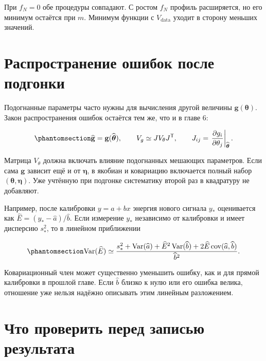 \documentclass[
  russian,
  11pt,
  a4paper,
  open=any]{scrbook}
\begin{document}
При \(f_N=0\) обе процедуры совпадают. С ростом \(f_N\) профиль
расширяется, но его минимум остаётся при \(m\). Минимум функции с
\(V_{\mathrm{data}}\) уходит в сторону меньших значений.

\section{Распространение ошибок после
подгонки}\label{ux440ux430ux441ux43fux440ux43eux441ux442ux440ux430ux43dux435ux43dux438ux435-ux43eux448ux438ux431ux43eux43a-ux43fux43eux441ux43bux435-ux43fux43eux434ux433ux43eux43dux43aux438}

Подогнанные параметры часто нужны для вычисления другой величины
\(\mathbf g(\boldsymbol\theta)\). Закон распространения ошибок остаётся
тем же, что и в главе 6:

\begin{equation}\protect\phantomsection\label{eq-ch12-post-fit-propagation}{
\widehat{\mathbf g}=\mathbf g(\widehat{\boldsymbol\theta}),
\qquad
V_g\simeq J V_\theta J^{\mathsf T},
\qquad
J_{ij}=\left.\frac{\partial g_i}{\partial\theta_j}\right|_{\widehat{\boldsymbol\theta}}.
}\end{equation}

Матрица \(V_\theta\) должна включать влияние подогнанных мешающих
параметров. Если сама \(\mathbf g\) зависит ещё и от
\(\boldsymbol\eta\), в якобиан и ковариацию включается полный набор
\((\boldsymbol\theta,\boldsymbol\eta)\). Уже учтённую при подгонке
систематику второй раз в квадратуру не добавляют.

Например, после калибровки \(y=a+bx\) энергия нового сигнала \(y_*\)
оценивается как \(\widehat E=(y_*-\widehat a)/\widehat b\). Если
измерение \(y_*\) независимо от калибровки и имеет дисперсию \(s_*^2\),
то в линейном приближении

\begin{equation}\protect\phantomsection\label{eq-ch12-inverse-calibration-error}{
\operatorname{Var}(\widehat E)\simeq
\frac{s_*^2+\operatorname{Var}(\widehat a)
+\widehat E^2\operatorname{Var}(\widehat b)
+2\widehat E\operatorname{cov}(\widehat a,\widehat b)}{\widehat b^2}.
}\end{equation}

Ковариационный член может существенно уменьшить ошибку, как и для прямой
калибровки в прошлой главе. Если \(\widehat b\) близко к нулю или его
ошибка велика, отношение уже нельзя надёжно описывать этим линейным
разложением.

\section{Что проверить перед записью
результата}\label{ux447ux442ux43e-ux43fux440ux43eux432ux435ux440ux438ux442ux44c-ux43fux435ux440ux435ux434-ux437ux430ux43fux438ux441ux44cux44e-ux440ux435ux437ux443ux43bux44cux442ux430ux442ux430}
\end{document}

